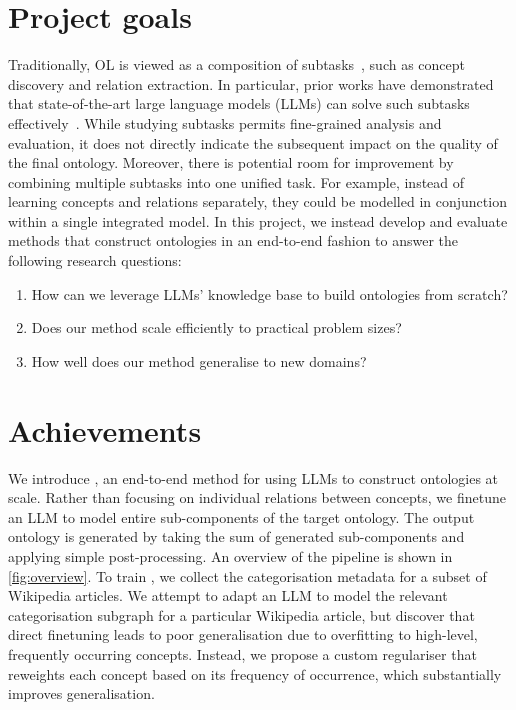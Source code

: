 \section{Project goals}

Traditionally, OL is viewed as a composition of subtasks~\cite{asim2018survey}, such as concept discovery and relation extraction. In particular, prior works have demonstrated that state-of-the-art large language models (LLMs) can solve such subtasks effectively~\cite{babaei2023llms4ol}. While studying subtasks permits fine-grained analysis and evaluation, it does not directly indicate the subsequent impact on the quality of the final ontology. Moreover, there is potential room for improvement by combining multiple subtasks into one unified task. For example, instead of learning concepts and relations separately, they could be modelled in conjunction within a single integrated model. In this project, we instead develop and evaluate methods that construct ontologies in an end-to-end fashion to answer the following research questions:
\begin{enumerate}
    \item How can we leverage LLMs' knowledge base to build ontologies from scratch?
    \item Does our method scale efficiently to practical problem sizes?
    \item How well does our method generalise to new domains?
\end{enumerate}

\section{Achievements}



We introduce \name, an end-to-end method for using LLMs to construct ontologies at scale. Rather than focusing on individual relations between concepts, we finetune an LLM to model entire sub-components of the target ontology. The output ontology is generated by taking the sum of generated sub-components and applying simple post-processing. An overview of the pipeline is shown in \cref{fig:overview}. To train \name, we collect the categorisation metadata for a subset of Wikipedia articles. We attempt to adapt an LLM to model the relevant categorisation subgraph for a particular Wikipedia article, but discover that direct finetuning leads to poor generalisation due to overfitting to high-level, frequently occurring concepts. Instead, we propose a custom regulariser that reweights each concept based on its frequency of occurrence, which substantially improves generalisation.

